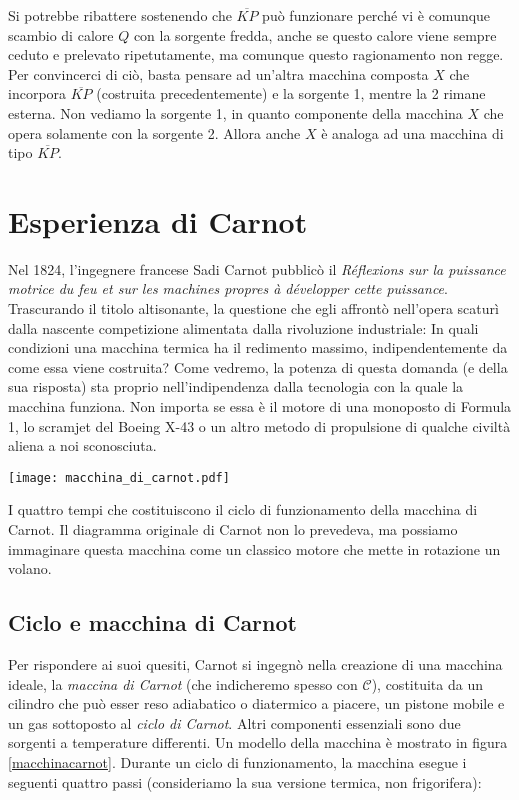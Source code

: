 Si potrebbe ribattere sostenendo che $\overline{KP}$ può funzionare
perché vi è comunque scambio di calore $Q$ con la sorgente fredda,
anche se questo calore viene sempre ceduto e prelevato ripetutamente,
ma comunque questo ragionamento non regge. Per convincerci di ciò,
basta pensare ad un'altra macchina composta $X$ che incorpora
$\overline{KP}$ (costruita precedentemente) e la sorgente 1, mentre la 2
rimane esterna. Non vediamo la sorgente 1, in quanto componente
della macchina $X$ che opera solamente con la sorgente 2. Allora anche $X$
è analoga ad una macchina di tipo $\overline{KP}$.


\section{Esperienza di Carnot}
Nel 1824, l'ingegnere francese Sadi Carnot pubblicò il
\textit{Réflexions sur la puissance motrice du feu et sur les machines
propres à développer cette puissance}. Trascurando il titolo
altisonante, la questione che egli affrontò nell'opera
scaturì dalla nascente competizione alimentata dalla rivoluzione industriale:
In quali condizioni una macchina termica ha il redimento
massimo, indipendentemente da come essa viene costruita? Come
vedremo, la potenza di questa domanda (e della sua risposta) sta
proprio nell'indipendenza dalla tecnologia con la quale la
macchina funziona. Non importa se essa è il motore di una monoposto
di Formula 1, lo scramjet del Boeing X-43 o un altro metodo di
propulsione di qualche civiltà aliena a noi sconosciuta.

\begin{marginfigure}
    \centering
    \texttt{[image: macchina\_di\_carnot.pdf]}
    \caption{I quattro tempi che costituiscono il ciclo di funzionamento della macchina di Carnot.
    Il diagramma originale di Carnot non lo prevedeva, ma possiamo immaginare questa macchina come
    un classico motore che mette in rotazione un volano.}
    \label{macchinacarnot}
\end{marginfigure}

\subsection{Ciclo e macchina di Carnot}
Per rispondere ai suoi quesiti,
Carnot si ingegnò nella creazione di una macchina ideale,
la \textit{maccina di Carnot} (che indicheremo spesso con $\mathcal{C}$),
costituita da un cilindro che può esser reso adiabatico o
diatermico a piacere, un pistone mobile e un gas sottoposto al
\textit{ciclo di Carnot}. Altri componenti essenziali sono due
sorgenti a temperature differenti.
Un modello della macchina è mostrato in figura \ref{macchinacarnot}.
Durante un ciclo
di funzionamento, la macchina esegue i seguenti quattro passi
(consideriamo la sua versione termica, non frigorifera):


